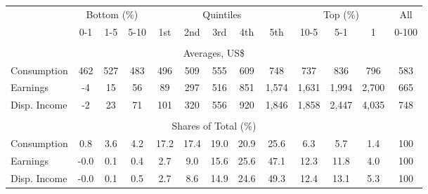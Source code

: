 \begin{tabular}{l c c c| c c c c c| c c c| c}
\toprule
&\multicolumn{3}{c|}{Bottom (\%)} & \multicolumn{5}{c|}{Quintiles} & \multicolumn{3}{c|}{Top (\%)} & All  \\
& 0-1 & 1-5 & 5-10 &  1st & 2nd & 3rd & 4th & 5th & 10-5 & 5-1 & 1 & 0-100 \\
\midrule \\
\multicolumn{13}{c}{Averages, US\$} \\
\midrule
Consumption  & 462  & 527  & 483  & 496  & 509  & 555  & 609  & 748  & 737  & 836  & 796  & 583 \\
Earnings         & -4 & 15 & 56 & 89 & 297 & 516 & 851 & 1,574 & 1,631 & 1,994 & 2,700 & 665 \\
Disp. Income & -2 & 23 & 71 & 101 & 320 & 556 & 920 & 1,846 & 1,858 & 2,447 & 4,035 & 748 \\
\midrule \\
\multicolumn{13}{c}{Shares of Total (\%)} \\
\midrule
Consumption  & 0.8   & 3.6   & 4.2   & 17.2   & 17.4   & 19.0   & 20.9   & 25.6   & 6.3   & 5.7   & 1.4   & 100 \\
Earnings         & -0.0  & 0.1  & 0.4  & 2.7  & 9.0  & 15.6  & 25.6  & 47.1  & 12.3  & 11.8  & 4.0  & 100 \\
Disp. Income & -0.0  & 0.1  & 0.5  & 2.7  & 8.6  & 14.9  & 24.6  & 49.3  & 12.4  & 13.1  & 5.3  & 100 \\
\bottomrule
\end{tabular}